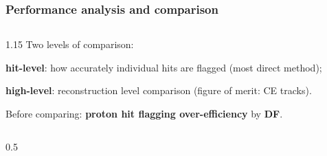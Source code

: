 \documentclass{beamer}
\begin{document}
\begin{frame}
\frametitle{Performance analysis and comparison}
           \vspace{-0.5mm}
  \begin{columns}
        \begin{column}{1.15\framewidth}
       {\small Two levels of comparison:}
    \setlength{\leftmargini}{1.2em}
    \begin{itemize}
      {\small  \item \textbf{hit-level}: how accurately individual hits are flagged (most direct method);
    \item \textbf{high-level}: reconstruction level comparison (figure of merit: CE tracks).
    \vspace{-1mm}
\item Before comparing: \textbf{proton hit flagging over-efficiency} by \textbf{DF}.}
    \end{itemize}
    \end{column}
    \end{columns}
        \vspace{-2mm}
    \begin{columns}
        \begin{column}{0.5\framewidth}


\end{column}
\end{columns}
\end{frame}
\end{document}
